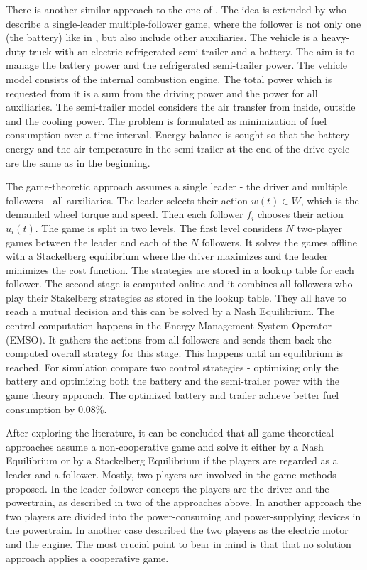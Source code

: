 
There is another similar approach to the one of \citet{dextreit2014game}. The idea is extended by \citet{chen2014game} who describe a single-leader multiple-follower game, where the follower is not only one (the battery) like in \citet{dextreit2014game}, but also include other auxiliaries. The vehicle is a heavy-duty truck with an electric refrigerated semi-trailer and a battery. The aim is to manage the battery power and the refrigerated semi-trailer power. The vehicle model consists of the internal combustion engine. The total power which is requested from it is a sum from the driving power and the power for all auxiliaries. The semi-trailer model considers the air transfer from inside, outside and the cooling power. The problem is formulated as minimization of fuel consumption over a time interval. Energy balance is sought so that the battery energy and the air temperature in the semi-trailer at the end of the drive cycle are the same as in the beginning.

The game-theoretic approach assumes a single leader - the driver and multiple followers - all auxiliaries. The leader selects their action $w(t) \in W$, which is the demanded wheel torque and speed. Then each follower $f_i$ chooses their action $u_i(t)$. The game is split in two levels. The first level considers $N$ two-player games between the leader and each of the $N$ followers. It solves the games offline with a Stackelberg equilibrium where the driver maximizes and the leader minimizes the cost function. The strategies are stored in a lookup table for each follower. The second stage is computed online and it combines all followers who play their Stakelberg strategies as stored in the lookup table. They all have to reach a mutual decision and this can be solved by a Nash Equilibrium. The central computation happens in the Energy Management System Operator (EMSO). It gathers the actions from all followers and sends them back the computed overall strategy for this stage. This happens until an equilibrium is reached. For simulation \citet{chen2014game} compare two control strategies - optimizing only the battery and optimizing both the battery and the semi-trailer power with the game theory approach. The optimized battery and trailer achieve better fuel consumption by 0.08\%.


After exploring the literature, it can be concluded that all game-theoretical approaches assume a non-cooperative game and solve it either by a Nash Equilibrium or by a Stackelberg Equilibrium if the players are regarded as a leader and a follower. Mostly, two players are involved in the game methods proposed. In the leader-follower concept the players are the driver and the powertrain, as described in two of the approaches above. In another approach the two players are divided into the power-consuming and power-supplying devices in the powertrain. In another case \citet{chin2010design} described the two players as the electric motor and the engine. The most crucial point to bear in mind is that that no solution approach applies a cooperative game.

